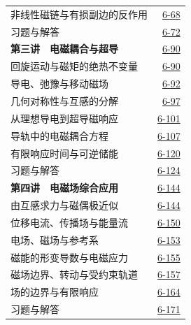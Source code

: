 \begin{longtable}{@{}p{}r@{}}
\hspace{1em}非线性磁链与有损副边的反作用&\href{course-page:6:71}{6-68}\\[2pt]
\hspace{1em}习题与解答&\href{course-page:6:75}{6-72}\\[2pt]
\textbf{第三讲　电磁耦合与超导}&\href{course-page:6:93}{6-90}\\[2pt]
\hspace{1em}回旋运动与磁矩的绝热不变量&\href{course-page:6:93}{6-90}\\[2pt]
\hspace{1em}导电、弛豫与移动磁场&\href{course-page:6:95}{6-92}\\[2pt]
\hspace{1em}几何对称性与互感的分解&\href{course-page:6:100}{6-97}\\[2pt]
\hspace{1em}从理想导电到超导磁响应&\href{course-page:6:104}{6-101}\\[2pt]
\hspace{1em}导轨中的电磁耦合方程&\href{course-page:6:110}{6-107}\\[2pt]
\hspace{1em}有限响应时间与可逆储能&\href{course-page:6:123}{6-120}\\[2pt]
\hspace{1em}习题与解答&\href{course-page:6:127}{6-124}\\[2pt]
\textbf{第四讲　电磁场综合应用}&\href{course-page:6:147}{6-144}\\[2pt]
\hspace{1em}由互感求力与磁偶极近似&\href{course-page:6:147}{6-144}\\[2pt]
\hspace{1em}位移电流、传播场与能量流&\href{course-page:6:153}{6-150}\\[2pt]
\hspace{1em}电场、磁场与参考系&\href{course-page:6:156}{6-153}\\[2pt]
\hspace{1em}磁能的形变导数与电磁应力&\href{course-page:6:158}{6-155}\\[2pt]
\hspace{1em}磁场边界、转动与受约束轨道&\href{course-page:6:160}{6-157}\\[2pt]
\hspace{1em}场的边界与有限响应&\href{course-page:6:167}{6-164}\\[2pt]
\hspace{1em}习题与解答&\href{course-page:6:174}{6-171}\\[2pt]
\end{longtable}
